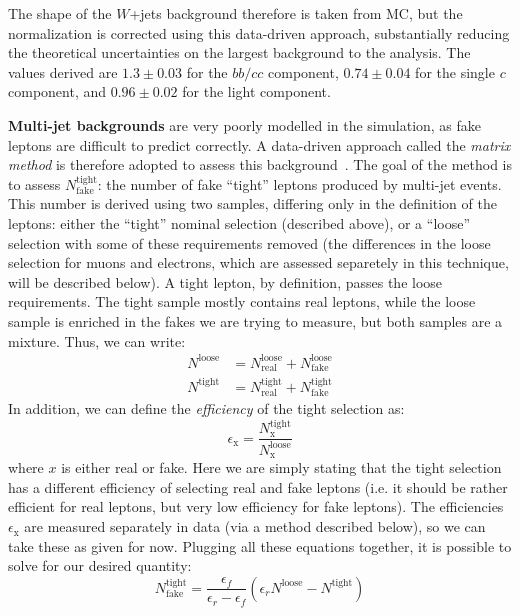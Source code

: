 The shape of the $W$+jets background therefore is taken from MC, but the normalization is corrected using this data-driven approach, substantially reducing the theoretical uncertainties on the largest background to the analysis. The values derived are $1.3 \pm 0.03$ for the $bb/cc$ component, $0.74 \pm 0.04$ for the single $c$ component, and $0.96 \pm 0.02$ for the light component.

\textbf{Multi-jet backgrounds} are very poorly modelled in the simulation, as fake leptons are difficult to predict correctly. A data-driven approach called the \textit{matrix method} is therefore adopted to assess this background~\cite{MatrixMethod}. The goal of the method is to assess $N_\mathrm{fake}^\mathrm{tight}$: the number of fake ``tight'' leptons produced by multi-jet events.  This number is derived using two samples, differing only in the definition of the leptons: either the ``tight'' nominal selection (described above), or a ``loose'' selection with some of these requirements removed (the differences in the loose selection for muons and electrons, which are assessed separetely in this technique, will be described below). A tight lepton, by definition, passes the loose requirements. The tight sample mostly contains real leptons, while the loose sample is enriched in the fakes we are trying to measure, but both samples are a mixture. Thus, we can write:
%
\begin{align}
N^\mathrm{loose} &= N_\mathrm{real}^\mathrm{loose} + N_\mathrm{fake}^\mathrm{loose}\\
N^\mathrm{tight} &= N_\mathrm{real}^\mathrm{tight} + N_\mathrm{fake}^\mathrm{tight}
\end{align}
%
In addition, we can define the \textit{efficiency} of the tight selection as:
%
\begin{equation}
\epsilon_\mathrm{x} = \frac{N^\mathrm{tight}_\mathrm{x}}{N^\mathrm{loose}_\mathrm{x}}
\end{equation}
%
where $x$ is either real or fake. Here we are simply stating that the tight selection has a different efficiency of selecting real and fake leptons (i.e. it should be rather efficient for real leptons, but very low efficiency for fake leptons). The efficiencies $\epsilon_\mathrm{x}$ are measured separately in data (via a method described below), so we can take these as given for now. Plugging all these equations together, it is possible to solve for our desired quantity:
%
\begin{equation}
N_\mathrm{fake}^\mathrm{tight} = \frac{\epsilon_f}{\epsilon_r - \epsilon_f} \left(\epsilon_r N^\mathrm{loose} - N^\mathrm{tight} \right)
\end{equation}

